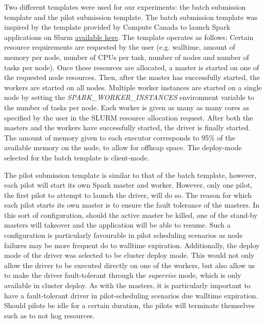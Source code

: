 \documentclass{IEEEtran}
\begin{document}
    Two different templates were used for our experiments: the batch submission
    template and the pilot submission template. The batch submission template was
    inspired by the template provided by Compute Canada to launch Spark applications 
    on Slurm \href{https://docs.computecanada.ca/wiki/Apache\_Spark/en}{available here}.
    The template operates as follows: Certain resource requirements are requested by
    the user (e.g. walltime, amount of memory per node, number of CPUs per task, number 
    of nodes and number of tasks per node). Once these resources are allocated, a 
    master is started on one of the requested node resources. Then, after the master
    has successfully started, the workers are started on all nodes. Multiple worker
    instances are started on a single node by setting the \textit{SPARK\_WORKER\_INSTANCES}
    environment variable to the number of tasks per node. Each worker is given as many as 
    many cores as specified by the user in the SLURM resource allocation request.
    After both the masters and the workers have successfully started, the driver is finally
    started. The amount of memory given to each executor corresponds to 95\% of the 
    available memory on the node, to allow for offheap space. 
    The deploy-mode selected for the batch template is client-mode. 

    The pilot submission template is similar to that of the batch template, however,
    each pilot will start its own Spark master and worker. However, only one pilot,
    the first pilot to attempt to launch the driver, will do so. The reason for 
    which each pilot starts its own master is to ensure the fault tolerance of the 
    masters. In this sort of configuration, should the active master be killed, one
    of the stand-by masters will takeover and the application will be able to 
    resume. Such a configuration is particularly favourable in pilot scheduling 
    scenarios as node failures may be more frequent do to walltime expiration.
    Additionally, the deploy mode of the driver was selected to be cluster deploy mode.
    This would not only allow the driver to be executed directly on one of the workers,
    but also allow us to make the driver fault-tolerant through the \textit{supervise} 
    mode, which is only available in cluster deploy. As with the masters, it is
    particularly important to have a fault-tolerant driver in pilot-scheduling scenarios due walltime
    expiration. Should pilots be idle for a certain duration, the pilots will terminate
    themselves such as to not hog resources.
    
\end{document}
